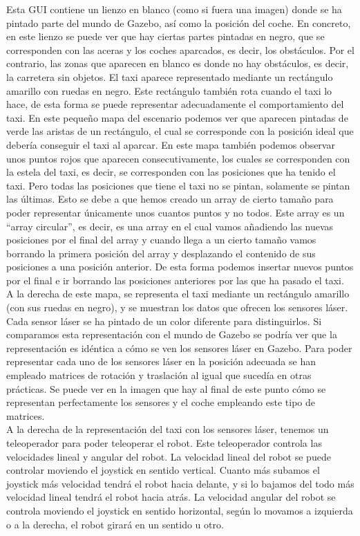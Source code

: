 Esta GUI contiene un lienzo en blanco (como si fuera una imagen) donde se ha pintado parte del mundo de Gazebo, así como la posición del coche. En concreto, en este lienzo se puede ver que hay ciertas partes pintadas en negro, que se corresponden con las aceras y los coches aparcados, es decir, los obstáculos. Por el contrario, las zonas que aparecen en blanco es donde no hay obstáculos, es decir, la carretera sin objetos. El taxi aparece representado mediante un rectángulo amarillo con ruedas en negro. Este rectángulo también rota cuando el taxi lo hace, de esta forma se puede representar adecuadamente el comportamiento del taxi. En este pequeño mapa del escenario podemos ver que aparecen pintadas de verde las aristas de un rectángulo, el cual se corresponde con la posición ideal que debería conseguir el taxi al aparcar. En este mapa también podemos observar unos puntos rojos que aparecen consecutivamente, los cuales se corresponden con la estela del taxi, es decir, se corresponden con las posiciones que ha tenido el taxi. Pero todas las posiciones que tiene el taxi no se pintan, solamente se pintan las últimas. Esto se debe a que hemos creado un array de cierto tamaño para poder representar únicamente unos cuantos puntos y no todos. Este array es un ``array circular'', es decir, es una array en el cual vamos añadiendo las nuevas posiciones por el final del array y cuando llega a un cierto tamaño vamos borrando la primera posición del array y desplazando el contenido de sus posiciones a una posición anterior. De esta forma podemos insertar nuevos puntos por el final e ir borrando las posiciones anteriores por las que ha pasado el taxi.\\

A la derecha de este mapa, se representa el taxi mediante un rectángulo amarillo (con sus ruedas en negro), y se muestran los datos que ofrecen los sensores láser. Cada sensor láser se ha pintado de un color diferente para distinguirlos. Si comparamos esta representación con el mundo de Gazebo se podría ver que la representación es idéntica a cómo se ven los sensores láser en Gazebo. Para poder representar cada uno de los sensores láser en la posición adecuada se han empleado matrices de rotación y traslación al igual que sucedía en otras prácticas. Se puede ver en la imagen que hay al final de este punto cómo se representan perfectamente los sensores y el coche empleando este tipo de matrices. \\

A la derecha de la representación del taxi con los sensores láser, tenemos un teleoperador para poder teleoperar el robot. Este teleoperador controla las velocidades lineal y angular del robot. La velocidad lineal del robot se puede controlar moviendo el joystick en sentido vertical. Cuanto más subamos el joystick más velocidad tendrá el robot hacia delante, y si lo bajamos del todo más velocidad lineal tendrá el robot hacia atrás. La velocidad angular del robot se controla moviendo el joystick en sentido horizontal, según lo movamos a izquierda o a la derecha, el robot girará en un sentido u otro.\\

